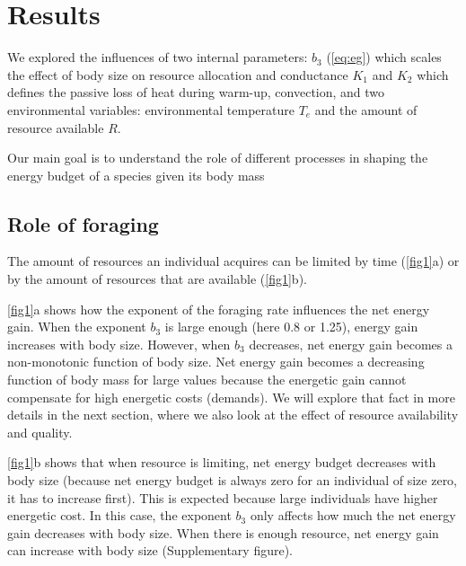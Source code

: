 \section*{Results}

We explored the influences of two internal parameters: $b_3$ (\cref{eq:eg}) which scales the effect of body size on resource allocation and conductance $K_1$ and $K_2$ which defines the passive loss of heat during warm-up, convection, and two environmental variables: environmental temperature $T_e$ and the amount of resource available $R$.

Our main goal is to understand the role of different processes in shaping the energy budget of a species given its body mass


\subsection*{Role of foraging}
The amount of resources an individual acquires can be limited by time (\cref{fig1}a) or by the amount of resources that are available (\cref{fig1}b).

\cref{fig1}a shows how the exponent of the foraging rate influences the net energy gain.
When the exponent $b_3$ is large enough (here 0.8 or 1.25), energy gain increases with body size.
However, when $b_3$ decreases, net energy gain becomes a non-monotonic function of body size.
Net energy gain becomes a decreasing function of body mass for large values because the energetic gain cannot compensate for high energetic costs (demands).
We will explore that fact in more details in the next section, where we also look at the effect of resource availability and quality.     

\cref{fig1}b shows that when resource is limiting, net energy budget decreases with body size (because net energy budget is always zero for an individual of size zero, it has to increase first).
This is expected because large individuals have higher energetic cost.
In this case, the exponent $b_3$ only affects how much the net energy gain decreases with body size. 
When there is enough resource, net energy gain can increase with body size (Supplementary figure). 

